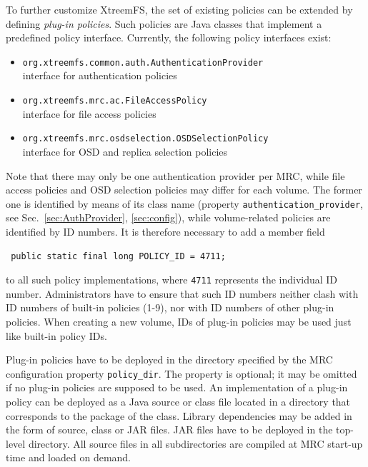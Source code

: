 \documentclass[a4paper,10pt]{book}
\begin{document}
To further customize XtreemFS, the set of existing policies can be extended by defining \textit{plug-in policies}. Such policies are Java classes that implement a predefined policy interface. Currently, the following policy interfaces exist:

\begin{itemize}
 \item \texttt{org.xtreemfs.common.auth.AuthenticationProvider}\\
   interface for authentication policies
 \item \texttt{org.xtreemfs.mrc.ac.FileAccessPolicy}\\
   interface for file access policies
 \item \texttt{org.xtreemfs.mrc.osdselection.OSDSelectionPolicy}\\
   interface for OSD and replica selection policies
\end{itemize}

Note that there may only be one authentication provider per MRC, while file access policies and OSD selection policies may differ for each volume. The former one is identified by means of its class name (property \texttt{authentication\_provider}, see Sec.\ \ref{sec:AuthProvider}, \ref{sec:config}), while volume-related policies are identified by ID numbers. It is therefore necessary to add a member field

\begin{verbatim}
 public static final long POLICY_ID = 4711;
\end{verbatim}

to all such policy implementations, where \texttt{4711} represents the individual ID number. Administrators have to ensure that such ID numbers neither clash with ID numbers of built-in policies (1-9), nor with ID numbers of other plug-in policies. When creating a new volume, IDs of plug-in policies may be used just like built-in policy IDs.

Plug-in policies have to be deployed in the directory specified by the MRC configuration property \texttt{policy\_dir}. The property is optional; it may be omitted if no plug-in policies are supposed to be used. An implementation of a plug-in policy can be deployed as a Java source or class file located in a directory that corresponds to the package of the class. Library dependencies may be added in the form of source, class or JAR files. JAR files have to be deployed in the top-level directory. All source files in all subdirectories are compiled at MRC start-up time and loaded on demand.
\end{document}
